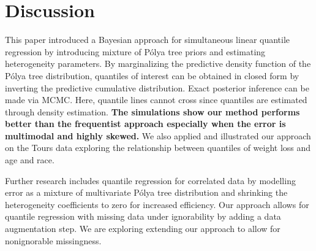 \documentclass[12pt]{article}
\newcommand{\polya}{P\'{o}lya}
\begin{document}
\section{Discussion}
\label{sec:discussion}
This paper introduced a Bayesian approach for simultaneous linear quantile
regression by introducing mixture of \polya{}
tree priors and estimating heterogeneity parameters. By marginalizing
the predictive density function of the \polya{} tree distribution,
quantiles of interest can be obtained in closed form by inverting the
predictive cumulative distribution. Exact posterior inference can
be made via MCMC. Here, quantile lines cannot cross since quantiles
are estimated through density estimation.  {\bf The simulations show our
method performs better than the frequentist approach especially when
the error is multimodal and highly skewed. }  We also applied and
illustrated our approach on the Tours data exploring the relationship
between quantiles of weight loss and age and race.

Further research includes quantile regression for correlated data by
modelling error as a mixture of multivariate \polya{} tree
distribution and shrinking the heterogeneity coefficients to zero for
increased efficiency.
Our approach allows for quantile regression with missing
data under ignorability by adding a data augmentation step.  We are
exploring extending our approach to allow for nonignorable
missingness.



\end{document}
